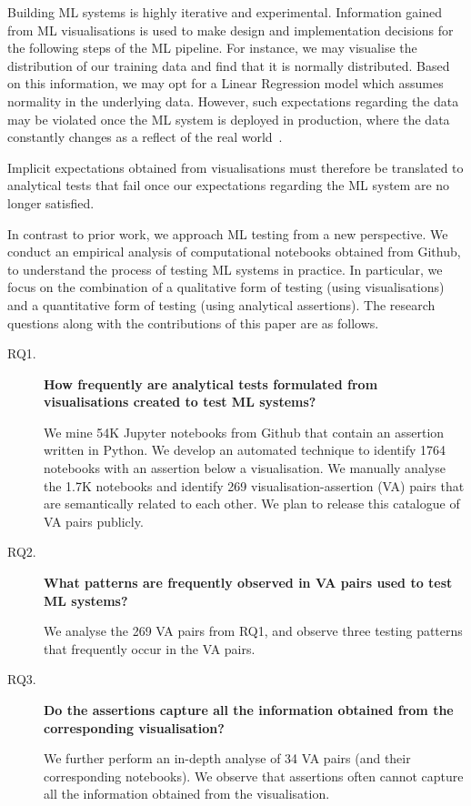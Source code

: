 \documentclass[conference]{IEEEtran}
\begin{document}
Building ML systems is highly iterative and experimental. Information gained from ML visualisations is used to make design and implementation decisions for the following steps of the ML pipeline. For instance, we may visualise the distribution of our training data and find that it is normally distributed. Based on this information, we may opt for a Linear Regression model which assumes normality in the underlying data. However, such expectations regarding the data may be violated once the ML system is deployed in production, where the data constantly changes as a reflect of the real world~\cite{amershi2019software,sambasivan2021everyone,breck2019data,baylor2017tfx}.

Implicit expectations obtained from visualisations must therefore be translated to analytical tests that fail once our expectations regarding the ML system are no longer satisfied.

In contrast to prior work, we approach ML testing from a new perspective. We conduct an empirical analysis of computational notebooks obtained from Github, to understand the process of testing ML systems in practice. In particular, we focus on the combination of a qualitative form of testing (using visualisations) and a quantitative form of testing (using analytical assertions). The research questions along with the contributions of this paper are as follows.

\begin{description}
  \item[RQ1.] \textbf{How frequently are analytical tests formulated from visualisations created to test ML systems?}

We mine 54K Jupyter notebooks from Github that contain an assertion written in Python. We develop an automated technique to identify 1764 notebooks with an assertion below a visualisation. We manually analyse the 1.7K notebooks and identify 269 visualisation-assertion (VA) pairs that are semantically related to each other. We plan to release this catalogue of VA pairs publicly.

\item[RQ2.] \textbf{What patterns are frequently observed in VA pairs used to test ML systems?}

We analyse the 269 VA pairs from RQ1, and observe three testing patterns that frequently occur in the VA pairs.

\item[RQ3.] \textbf{Do the assertions capture all the information obtained from the corresponding visualisation?}

We further perform an in-depth analyse of 34 VA pairs (and their corresponding notebooks). We observe that assertions often cannot capture all the information obtained from the visualisation.

\end{description}
\end{document}
